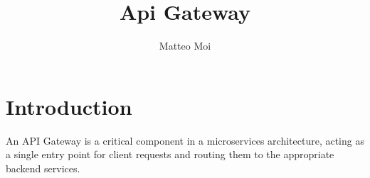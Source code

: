 \documentclass[a4paper, 12pt]{article}
\begin{document}
    \title{Api Gateway}
    \author{Matteo Moi}
    \date{}
    \maketitle

    \tableofcontents
    \newpage



    \section{Introduction}

    An API Gateway is a critical component in a microservices architecture, acting as a single entry point for client requests and routing them to the appropriate backend services.
\end{document}
